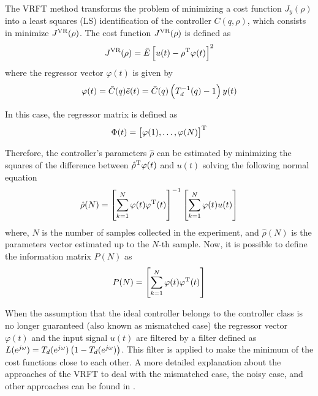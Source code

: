 The VRFT method transforms the problem of minimizing a cost function $J_y(\rho)$ into a least squares (LS) identification of the controller $C(q, \rho)$, which consists in minimize $J^\text{VR}(\rho)$.
The cost function $J^\text{VR}(\rho)$ is defined as
\[
	J^\text{VR}(\rho) = \bar{E} \left[ u(t) - \rho^\text{T} \varphi(t) \right]^2
\]
where the regressor vector $\varphi(t)$ is given by
\begin{equation}
	\varphi(t) = \bar{C}(q)\bar{e}(t) = \bar{C}(q) \left( T_d^{-1}(q) -1 \right)y(t)
\label{eq:reg_vector_vrft}
\end{equation}

In this case, the regressor matrix is defined as
\begin{equation}
	\Phi(t) = \left[ \varphi(1), \ldots, \varphi(N) \right]^\text{T}
\label{eq:reg_mat_vrft}
\end{equation}

Therefore, the controller's parameters $\hat{\rho}$ can be estimated by minimizing the squares of the difference between $\hat{\rho}^\text{T} \varphi(t)$ and $u(t)$ solving the following normal equation
\begin{equation}
	\hat{\rho}(N) = \left[ \sum \limits_{k=1}^N \varphi(t) \varphi^\text{T}(t) \right]^{-1} \left[\sum \limits_{k=1}^N \varphi(t) u(t) \right] \label{eq:rho_idealcase}
\end{equation}
where, $N$ is the number of samples collected in the experiment, and $\hat{\rho}(N)$ is the parameters vector estimated up to the $N$-th sample.
Now, it is possible to define the information matrix $P(N)$ as
\begin{equation}
	P(N) = \left[ \sum \limits_{k=1}^N \varphi(t) \varphi^\text{T}(t) \right]
\label{eq:inf_mat_vrft}
\end{equation}

When the assumption that the ideal controller belongs to the controller class is no longer guaranteed (also known as mismatched case) the regressor vector $\varphi(t)$ and the input signal $u(t)$ are filtered by a filter defined as $L(e^{j\omega}) = T_d(e^{j\omega}) \left( 1- T_d(e^{j\omega}) \right)$.
This filter is applied to make the minimum of the cost functions close to each other.
A more detailed explanation about the approaches of the VRFT to deal with the mismatched case, the noisy case, and other approaches can be found in \cite{bazanella2011data}.

